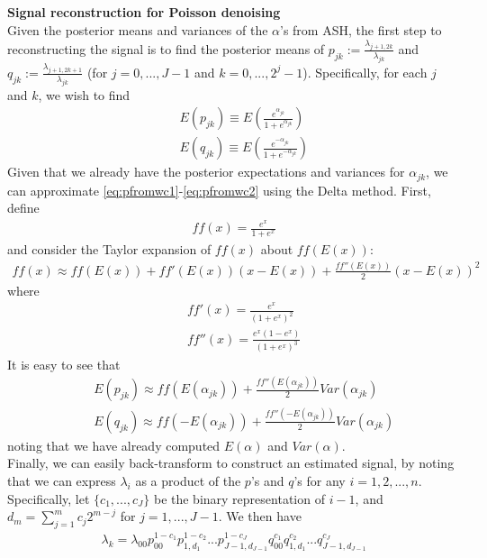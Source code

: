 \documentclass[12pt]{article}
\newcommand{\Ga}{\alpha}
\newcommand{\Gl}{\lambda}    \newcommand{\GL}{\Lambda}
\begin{document}
\begin{appendices}
\section{}\label{app:reconstruction}\bigskip
\textbf{Signal reconstruction for Poisson denoising}\bigskip\\
Given the posterior means and variances of the $\Ga$'s from ASH, the first step to reconstructing the signal is to find the posterior means of $p_{jk}:=\frac{\Gl_{j+1,2k}}{\Gl_{jk}}$ and $q_{jk}:=\frac{\Gl_{j+1,2k+1}}{\Gl_{jk}}$ (for $j=0,...,J-1$ and $k=0,...,2^j-1$). Specifically, for each $j$ and $k$, we wish to find
\begin{eqnarray}\label{eq:pfromwc1}
&&E(p_{jk})\equiv E\left(\frac{e^{\Ga_{jk}}}{1+e^{\Ga_{jk}}}\right)\\
\label{eq:pfromwc2}&&E(q_{jk})\equiv E\left(\frac{e^{-\Ga_{jk}}}{1+e^{-\Ga_{jk}}}\right)\end{eqnarray}
Given that we already have the posterior expectations and variances for $\Ga_{jk}$, we can approximate \eqref{eq:pfromwc1}-\eqref{eq:pfromwc2} using the Delta method. First, define
\begin{eqnarray}\label{eq:ff}ff(x)=\frac{e^x}{1+e^x}\end{eqnarray}
and consider the Taylor expansion of $ff(x)$ about $ff(E(x))$:
\begin{eqnarray}\label{eq:delta}ff(x)\approx ff(E(x))+ff'(E(x))(x-E(x))+\frac{ff''(E(x))}{2}(x-E(x))^2\end{eqnarray}
where
\begin{eqnarray}
\label{eq:fderiv}&&ff'(x)=\frac{e^x}{(1+e^x)^2}\\
\label{eq:sderiv}&&ff''(x)=\frac{e^x(1-e^{x})}{(1+e^x)^3}
\end{eqnarray}
It is easy to see that
\begin{eqnarray}
&&E(p_{jk})\approx ff(E(\Ga_{jk}))+\frac{ff''(E(\Ga_{jk}))}{2}Var(\Ga_{jk})\\
\label{eq:Ep}&&E(q_{jk})\approx ff(-E(\Ga_{jk}))+\frac{ff''(-E(\Ga_{jk}))}{2}Var(\Ga_{jk})
\end{eqnarray}
noting that we have already computed $E(\Ga)$ and $Var(\Ga)$.\bigskip\\
Finally, we can easily back-transform to construct an estimated signal, by noting that we can express $\Gl_i$ as a product of the $p$'s and $q$'s for any $i=1,2,...,n$. Specifically, let $\{c_1,...,c_J\}$ be the binary representation of $i-1$, and $d_m=\sum_{j=1}^m c_j2^{m-j}$ for $j=1,...,J-1$. We then have
\begin{eqnarray}\label{eq:product}\Gl_k=\Gl_{00}p_{00}^{1-c_1}p_{1,d_1}^{1-c_2}...p_{J-1,d_{J-1}}^{1-c_J}q_{00}^{c_1}q_{1,d_1}^{c_2}...q_{J-1,d_{J-1}}^{c_J}\end{eqnarray}

\end{appendices}
\end{document}

